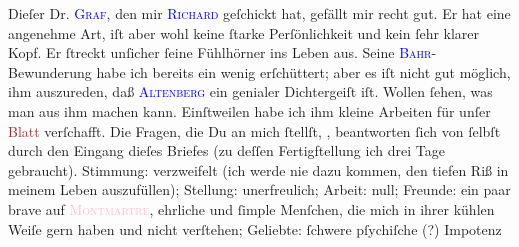            \pstart
           Dieſer Dr. \textsc{\textcolor{blue}{Graf}{}\ledrightnote{\textcolor{blue}{Max Graf}}}, den mir \textsc{\textcolor{blue}{Richard}{}\ledrightnote{\textcolor{blue}{Richard Beer-Hofmann}}} geſchickt hat, gefällt mir recht gut. Er hat eine angenehme Art, iſt aber wohl
               keine {\pb}ſtarke Perſönlichkeit und kein ſehr klarer
               Kopf. Er ſtreckt unſicher ſeine Fühlhörner ins 
               Leben aus.  Seine \textsc{\textcolor{blue}{Bahr}{}\ledrightnote{\textcolor{blue}{Hermann Bahr}}}-Bewunderung habe ich bereits ein wenig erſchüttert; aber es iſt nicht gut
               möglich, ihm auszureden, daß \textsc{\textcolor{blue}{Altenberg}{}\ledrightnote{\textcolor{blue}{Peter Altenberg}}} ein genialer Dichtergeiſt iſt. Wollen ſehen, was man aus ihm machen kann.
               Einſtweilen habe ich ihm kleine Arbeiten für unſer \textcolor{brown}{Blatt}{} verſchafft.\pend
           \pstart
            Die Fragen, die Du an mich ſtellſt, \label{K_L02792-77v}\label{K_L02792-77h},
               beantworten ſich von ſelbſt durch den Eingang dieſes Briefes {\pb}(zu deſſen Fertigftellung ich drei Tage gebraucht).
               Stimmung: verzweifelt (ich werde nie dazu kommen, den tiefen Riß in meinem Leben  auszufüllen); Stellung: unerfreulich; Arbeit: null;
               Freunde: ein paar brave \label{K_L02792-34v}\label{K_L02792-34h} auf \textsc{\textcolor{pink}{Montmartre}{}\ledrightnote{\textcolor{pink}{Paris 18 Buttes-Montmartre}}}, ehrliche und ſimple Menſchen, die mich in ihrer kühlen Weiſe gern haben und
               nicht verſtehen; Geliebte: ſchwere pſychiſche (?) Impotenz{\dotsfour}\pend
           \pstart
